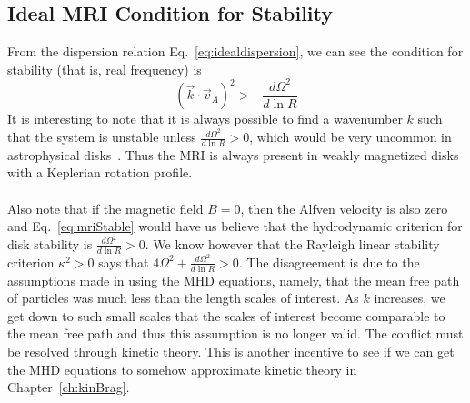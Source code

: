 \subsection{Ideal MRI Condition for Stability}
From the dispersion relation Eq.~\ref{eq:idealdispersion}, we can see the condition for stability (that is, real frequency) is
\begin{equation}
  (\vec k\cdot\vec v_A)^2>-\frac{d\Omega^2}{d\ln R}
\end{equation}
It is interesting to note that it is always possible to find a wavenumber $k$ such that the system is unstable unless $\frac{d\Omega^2}{d\ln R}>0$, which would be very uncommon in astrophysical disks~\cite{BH1998}. Thus the MRI is always present in weakly magnetized disks with a Keplerian rotation profile.\\
\\
Also note that if the magnetic field $B=0$, then the Alfven velocity is also zero and Eq.~\ref{eq:mriStable} would have us believe that the hydrodynamic criterion for disk stability is $\frac{d\Omega^2}{d\ln R}>0$. We know however that the Rayleigh linear stability criterion $\kappa^2>0$ says that $4\Omega^2+\frac{d\Omega^2}{d\ln R}>0$. The disagreement is due to the assumptions made in using the MHD equations, namely, that the mean free path of particles was much less than the length scales of interest. As $k$ increases, we get down to such small scales that the scales of interest become comparable to the mean free path and thus this assumption is no longer valid. The conflict must be resolved through kinetic theory. This is another incentive to see if we can get the MHD equations to somehow approximate kinetic theory in Chapter~\ref{ch:kinBrag}.


